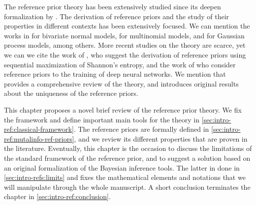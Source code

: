 The reference prior theory has been extensively studied since its deepen formalization by \citet{berger_formal_2009}. 
{The derivation of reference priors and the study of their properties in different contexts has been extensively focused. We can mention the works in \cite{berger_objective_2008} for bivariate normal models, 
 \cite{berger_ordered_1992} for multinomial models,  and \cite{gu_parallel_2016} for Gaussian process models, among others. 
More recent studies on the theory are scarce, yet we can
we cite the work of \citet{bodnar_analytical_2014}, who suggest the derivation of reference priors using sequential maximization of Shannon's entropy, and the work of \citet{gao_deep_2022} 
who consider reference priors to the training of deep neural networks. 
We mention that \citet{mure_objective_2018} provides a comprehensive review of the theory, and introduces original results about the uniqueness of the reference priors.}

This chapter proposes a novel brief review of the reference prior theory. We fix the framework and define important main tools for the theory in \cref{sec:intro-ref:classical-framework}. %
The reference priors are formally defined in \cref{sec:intro-ref:mutalinfo-ref-priors}, and we review its different properties that are proven in the literature.
Eventually, this chapter is the occasion to discuss the limitations of the standard framework of the reference prior, and to suggest a solution based on an original formalization of the Bayesian inference tools.  The latter in done in \cref{sec:intro-refs:limits} and fixes the mathematical elements and notations that we will manipulate through the whole manuscript. A short conclusion terminates the chapter in \cref{sec:intro-ref:conclusion}.









